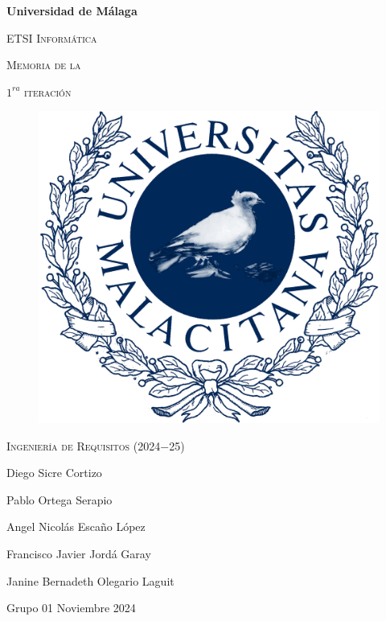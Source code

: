 \documentclass[12pt, a4paper, titlepage]{article}
\begin{document}
\begin{titlepage}
    \centering
    {\bfseries\LARGE Universidad de Málaga\par}
    \vspace{1cm}
    {\scshape\Large ETSI Informática\par}
    \vspace{2cm}
    {\scshape\Huge Memoria de la\par}
    \vspace{0.1cm}
    {\scshape\Huge $1^{ra}$ iteración}
    \vspace{2cm}
    \begin{figure}[H]
        \centering
         \includegraphics[width=0.30\linewidth]{assets/umaLogo.png}
    \end{figure}
    \vfill
    {\scshape\Large Ingeniería de Requisitos (2024$-$25)\par}
    \vfill
    {\Large Diego Sicre Cortizo\par}
    {\Large Pablo Ortega Serapio\par}
    {\Large Angel Nicolás Escaño López\par}
    {\Large Francisco Javier Jordá Garay\par}
    {\Large Janine Bernadeth Olegario Laguit\par}
    \vspace{1cm}
    {\Large Grupo 01}
    \vfill
    {\Large Noviembre 2024}
\end{titlepage}
\thispagestyle{empty}

\tableofcontents %
\thispagestyle{empty} %

\newpage

\listoffigures %
\thispagestyle{empty}

\newpage

\thispagestyle{empty}
\begin{abstract}
Para comprender mejor el rol de los actores en cada caso de uso se recomienda consultar el apartado \emph{3.3 Perfiles de los Participantes} y \emph{3.4 Perfiles de Usuario} del DGR Mini PIM donde se define cada uno y como se refiere a ellos para evitar ambigüedades. 
También consultar \emph{1.3 Definiciones, acrónimos y abreviaturas} en caso de no entender alguna palabra técnica usada en esta memoria.
\end{abstract}
\end{document}
